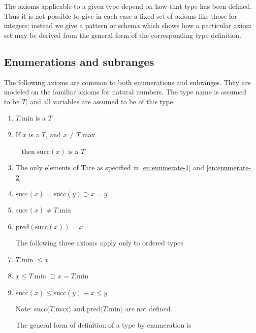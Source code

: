 The axioms applicable to a given type depend on how that type has been defined. Thus it is not possible to give in each case a fixed set of axioms like those for integers; instead we give a pattern or schema which shows how a particular axiom set may be derived from the general form of the corresponding type definition.

\subsection{Enumerations and subranges}

The following axioms are common to both enumerations and subranges. They are modeled on the familiar axioms for natural numbers. The type name is assumed to be $T$, and all variables are assumed to be of this type.

\begin{enumerate}[wide, nosep, label=(\arabic*)]
	\item \label{en:enumerate-1}
	$T$.min is a $T$
	
	\item \label{en:enumerate-2}
	If $x$ is a $T$, and $x\neq T$.max

	\qquad~ then succ$(x)$ is a $T$

	\item The only elements of Tare as specified in \ref{en:enumerate-1} and \ref{en:enumerate-2}

	\item $\text{succ}(x) = \text{succ}(y) \supset x = y$

	\item succ$(x) \neq T$.min

	\item $\text{pred}(\text{succ}(x)) = x$

	\noindent
	The following three axioms apply only to ordered types

	\setcounter{enumi}{6}
	\item $T$.min $\leqslant x$

	\item $x \leqslant T$.min $\supset x = T$.min

	\item \label{en:enumerate-9}
	$\text{succ}(x) \leqslant \text{succ}(y) \equiv x \leqslant y$

	\noindent
	Note: succ$(T$.max$)$ and pred$(T$.min$)$ are not defined.

	The general form of definition of a type by enumeration is


\end{enumerate}
